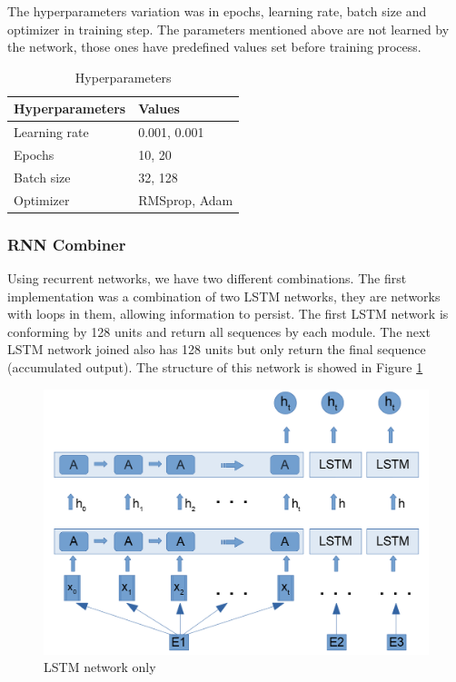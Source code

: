 \documentclass[12pt]{report}
\begin{document}
The hyperparameters variation was in epochs, learning rate, batch size and optimizer in training step. The parameters mentioned above are not learned by the network, those ones have predefined values set before training process.

\begin{table}[htb]
	\centering
	\begin{tabular}{||M{4.5cm}|M{4cm}||}
		\hline
		\textbf{Hyperparameters} 	& \textbf{Values} 	\\ \hline
		Learning rate           	& 0.001, 0.001      \\ \hline
		Epochs         				& 10, 20            \\ \hline
		Batch size           		& 32, 128 			\\ \hline		Optimizer                 	& RMSprop, Adam     \\ \hline	
	\end{tabular}
	\caption{Hyperparameters}\label{Hyperparameters}
\end{table}

\subsubsection{\ac{RNN} Combiner}
Using recurrent networks, we have two different combinations. The first implementation was a combination of two LSTM networks, they are networks with loops in them, allowing information to persist. The first LSTM network is conforming by 128 units and return all sequences by each module. The next LSTM network joined also has 128 units but only return the final sequence (accumulated output). The structure of this network is showed in Figure \ref{figure:lstm_only}

\begin{figure}[H]	
	\centering
	\includegraphics[width=150mm, scale = 1]{images/12_lstm_only.png}	
	\caption{LSTM network only}	
	\label{figure:lstm_only}
\end{figure}
\end{document}
